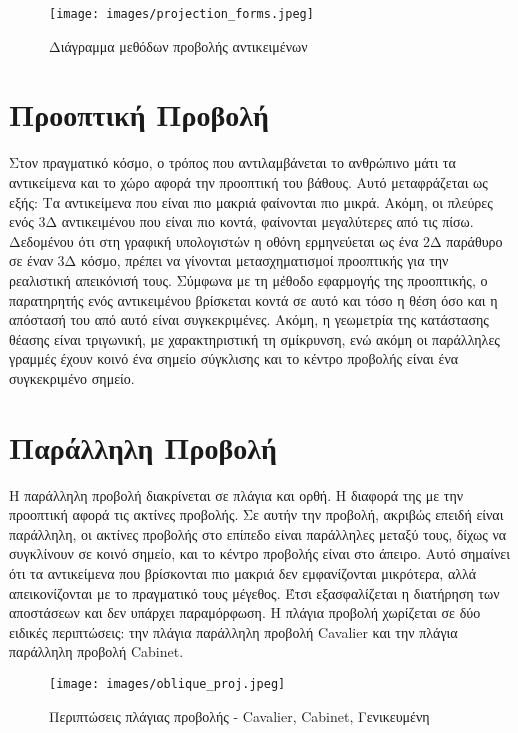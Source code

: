 \vspace{3em}
\begin{figure}[H]
\centering
\texttt{[image: images/projection\_forms.jpeg]}
\caption{Διάγραμμα μεθόδων προβολής αντικειμένων}
\end{figure}




\section{Προοπτική Προβολή}

Στον πραγματικό κόσμο, ο τρόπος που αντιλαμβάνεται το ανθρώπινο μάτι τα αντικείμενα και το χώρο αφορά την προοπτική του βάθους. Αυτό μεταφράζεται ως εξής: Τα αντικείμενα που είναι πιο μακριά φαίνονται πιο μικρά. Ακόμη, οι πλεύρες ενός 3Δ αντικειμένου που είναι πιο κοντά, φαίνονται μεγαλύτερες από τις πίσω. Δεδομένου ότι στη γραφική υπολογιστών η οθόνη ερμηνεύεται ως ένα 2Δ παράθυρο σε έναν 3Δ κόσμο, πρέπει να γίνονται μετασχηματισμοί προοπτικής για την ρεαλιστική απεικόνισή τους. Σύμφωνα με τη μέθοδο εφαρμογής της προοπτικής, ο παρατηρητής ενός αντικειμένου βρίσκεται κοντά σε αυτό και τόσο η θέση όσο και η απόστασή του από αυτό είναι συγκεκριμένες. Ακόμη, η γεωμετρία της κατάστασης θέασης είναι τριγωνική, με χαρακτηριστική τη σμίκρυνση, ενώ ακόμη οι παράλληλες γραμμές έχουν κοινό ένα σημείο σύγκλισης και το κέντρο προβολής είναι ένα συγκεκριμένο σημείο. 

\section{Παράλληλη Προβολή}

Η παράλληλη προβολή διακρίνεται σε πλάγια και ορθή. Η διαφορά της με την προοπτική αφορά τις ακτίνες προβολής. Σε αυτήν την προβολή, ακριβώς επειδή είναι παράλληλη, οι ακτίνες προβολής στο επίπεδο είναι παράλληλες μεταξύ τους, δίχως να συγκλίνουν σε κοινό σημείο, και το κέντρο προβολής είναι στο άπειρο. Αυτό σημαίνει ότι τα αντικείμενα που βρίσκονται πιο μακριά δεν εμφανίζονται μικρότερα, αλλά απεικονίζονται με το πραγματικό τους μέγεθος. Έτσι εξασφαλίζεται η διατήρηση των αποστάσεων και δεν υπάρχει παραμόρφωση. Η πλάγια προβολή χωρίζεται σε δύο ειδικές περιπτώσεις: την πλάγια παράλληλη προβολή Cavalier και την πλάγια παράλληλη προβολή Cabinet.

\vspace{1em}
\begin{figure}[H]
\centering
\texttt{[image: images/oblique\_proj.jpeg]}
\caption{Περιπτώσεις πλάγιας προβολής - Cavalier, Cabinet, Γενικευμένη}
\end{figure}


